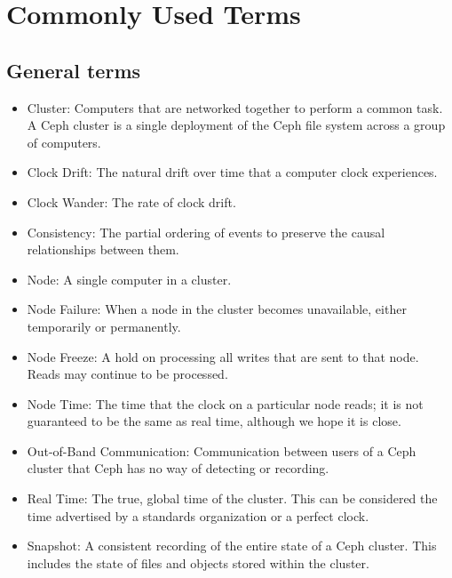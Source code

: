 \chapter{Commonly Used Terms}
\label{sec:terms}

\section{General terms}
\begin{itemize}

\item Cluster: Computers that are networked together to perform a
  common task. A Ceph cluster is a single deployment of the Ceph file
  system across a group of computers.
    
\item Clock Drift: The natural drift over time that a computer clock
  experiences.
    
\item Clock Wander: The rate of clock drift.

\item Consistency: The partial ordering of events to preserve the
  causal relationships between them.
    
\item Node: A single computer in a cluster.
  
\item Node Failure: When a node in the cluster becomes unavailable,
  either temporarily or permanently.
      
\item Node Freeze: A hold on processing all writes that are sent to
  that node. Reads may continue to be processed.
    
\item Node Time: The time that the clock on a particular node reads;
  it is not guaranteed to be the same as real time, although we hope
  it is close.
    
\item Out-of-Band Communication: Communication between users of a Ceph
  cluster that Ceph has no way of detecting or recording.
    
\item Real Time: The true, global time of the cluster. This can be
  considered the time advertised by a standards organization or a
  perfect clock.

\item Snapshot: A consistent recording of the entire state of a Ceph
  cluster.  This includes the state of files and objects stored within
  the cluster.
    

\end{itemize}
